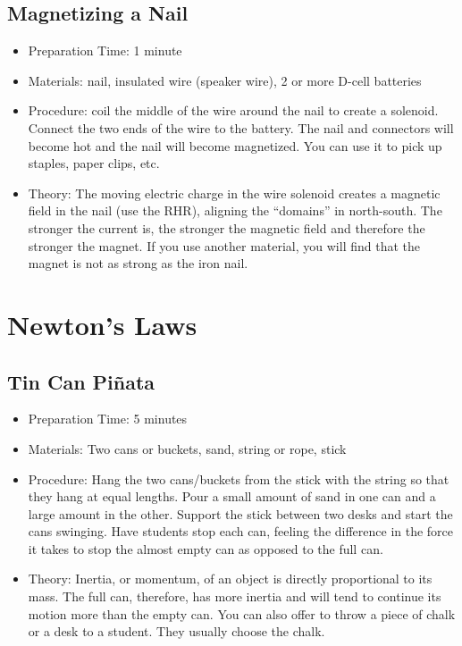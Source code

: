 \subsection{Magnetizing a Nail}
\begin{itemize}
\item{Preparation Time: 1 minute}
\item{Materials: nail, insulated wire (speaker wire), 2 or more D-cell batteries}
\item{Procedure: coil the middle of the wire around the nail to create a solenoid. Connect the two ends of the wire to the battery. The nail and connectors will become hot and the nail will become magnetized. You can use it to pick up staples, paper clips, etc.}
\item{Theory: The moving electric charge in the wire solenoid creates a magnetic field in the nail (use the RHR), aligning the “domains” in north-south. The stronger the current is, the stronger the magnetic field and therefore the stronger the magnet. If you use another material, you will find that the magnet is not as strong as the iron nail.}
\end{itemize}

\section{Newton’s Laws}

\subsection{Tin Can Piñata}
\begin{itemize}
\item{Preparation Time: 5 minutes}
\item{Materials: Two cans or buckets, sand, string or rope, stick}
\item{Procedure: Hang the two cans/buckets from the stick with the string so that they hang at equal lengths. Pour a small amount of sand in one can and a large amount in the other. Support the stick between two desks and start the cans swinging. Have students stop each can, feeling the difference in the force it takes to stop the almost empty can as opposed to the full can.}
\item{Theory: Inertia, or momentum, of an object is directly proportional to its mass. The full can, therefore, has more inertia and will tend to continue its motion more than the empty can. You can also offer to throw a piece of chalk or a desk to a student. They usually choose the chalk.}
\end{itemize}

